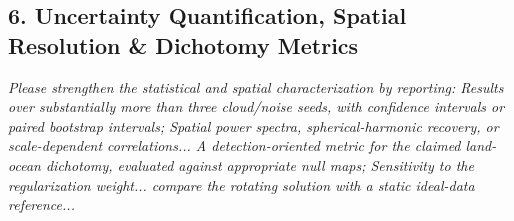 \documentclass[11pt]{article}
\begin{document}
\subsection*{6. Uncertainty Quantification, Spatial Resolution \& Dichotomy Metrics}

\begin{refcomment}
\textit{Please strengthen the statistical and spatial characterization by reporting: Results over substantially more than three cloud/noise seeds, with confidence intervals or paired bootstrap intervals; Spatial power spectra, spherical-harmonic recovery, or scale-dependent correlations... A detection-oriented metric for the claimed land-ocean dichotomy, evaluated against appropriate null maps; Sensitivity to the regularization weight... compare the rotating solution with a static ideal-data reference...}
\end{refcomment}
\end{document}
